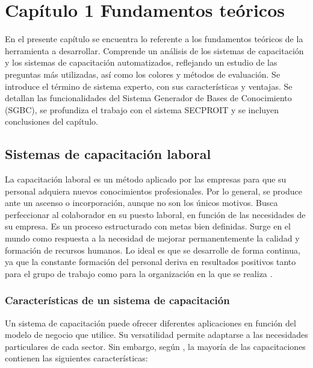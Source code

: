 \chapter*{Capítulo 1 \vspace{0.5cm} \break Fundamentos teóricos}
\setcounter{chapter}{1}

En el presente capítulo se encuentra lo referente a los fundamentos teóricos de la herramienta a desarrollar. Comprende un análisis de los sistemas de capacitación y los sistemas de capacitación automatizados, reflejando un estudio de las preguntas más utilizadas, así como los colores y métodos de evaluación. Se introduce el término de sistema experto, con sus características y ventajas. Se detallan las funcionalidades del Sistema Generador de Bases de Conocimiento (SGBC), se profundiza el trabajo con el sistema SECPROIT y se incluyen conclusiones del capítulo.


\section{Sistemas de capacitación laboral}
La capacitación laboral es un método aplicado por las empresas para que su personal adquiera nuevos conocimientos profesionales. Por lo general, se produce ante un ascenso o incorporación, aunque no son los únicos motivos. Busca perfeccionar al colaborador en su puesto laboral, en función de las necesidades de su empresa. Es un proceso estructurado con metas bien definidas. Surge en el mundo como respuesta a la necesidad de mejorar permanentemente la calidad y formación de recursos humanos. Lo ideal es que se desarrolle de forma continua, ya que la constante formación del personal deriva en resultados positivos tanto para el grupo de trabajo como para la organización en la que se realiza \cite{Denby2010}.

\subsection{Características de un sistema de capacitación}
Un sistema de capacitación puede ofrecer diferentes aplicaciones en función del modelo de negocio que utilice. Su versatilidad permite adaptarse a las necesidades particulares de cada sector. Sin embargo, según \cite{Paez2022}, la mayoría de las capacitaciones contienen las siguientes características:

